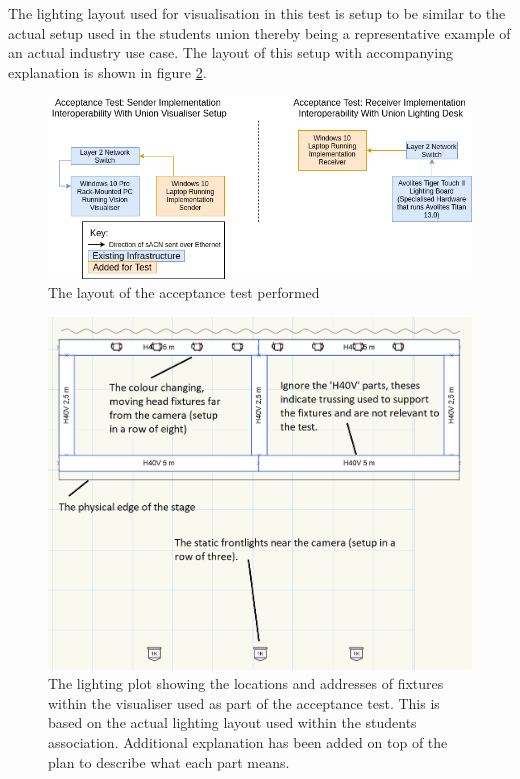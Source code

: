 \documentclass[11pt,a4paper]{article}
\begin{document}
The lighting layout used for visualisation in this test is setup to be similar to the actual setup used in the students union thereby being a representative example of an actual industry use case. The layout of this setup with accompanying explanation is shown in figure \ref{ACCEPTANCE_TEST_LX_PLOT}. 

\begin{figure}[H]
	\includegraphics[width=\textwidth]{CS4099-Acceptance-Test-Layout.png}
	\caption{The layout of the acceptance test performed}
	\label{ACCEPTANCE_TEST_LAYOUT}
\end{figure}

\begin{figure}[H]
	\includegraphics[width=\textwidth]{Union-Setup-Vision-File-LX-Plot.png}
	\caption{The lighting plot showing the locations and addresses of fixtures within the visualiser used as part of the acceptance test. This is based on the actual lighting layout used within the students association. Additional explanation has been added on top of the plan to describe what each part means.}
	\label{ACCEPTANCE_TEST_LX_PLOT}
\end{figure}
\end{document}
